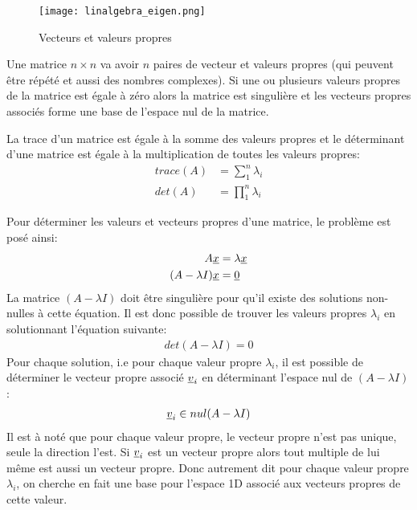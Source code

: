 \begin{figure}[H]
	\centering
		\texttt{[image: linalgebra\_eigen.png]}
	\caption{Vecteurs et valeurs propres}
	\label{fig:eigen}
\end{figure}

Une matrice $n \times n$ va avoir $n$ paires de vecteur et valeurs propres (qui peuvent être répété et aussi des nombres complexes). Si une ou plusieurs valeurs propres de la matrice est égale à zéro alors la matrice est singulière et les vecteurs propres associés forme une base de l'espace nul de la matrice. 

La trace d'un matrice est égale à la somme des valeurs propres et le déterminant d'une matrice est égale à la multiplication de toutes les valeurs propres:
\begin{align}
trace(A) &= \sum_1^n{ \lambda_i } \\
det(A)   &= \prod_1^n{ \lambda_i }
\end{align}

Pour déterminer les valeurs et vecteurs propres d'une matrice, le problème est posé ainsi:
\begin{align}
A \underline{x} &= \lambda  \underline{x} \\
(A - \lambda I) \underline{x} &= \underline{0}
\end{align}
La matrice $(A - \lambda I)$ doit être singulière pour qu'il existe des solutions non-nulles à cette équation. Il est donc possible de trouver les valeurs propres $\lambda_i$ en solutionnant l'équation suivante:
\begin{align}
det(A - \lambda I) = 0
\end{align}
Pour chaque solution, i.e pour chaque valeur propre $\lambda_i$, il est possible de déterminer le vecteur propre associé $\underline{v}_i$ en déterminant l'espace nul de $(A - \lambda I)$:
\begin{align}
\underline{v}_i \in nul(A - \lambda I)
\end{align}
Il est à noté que pour chaque valeur propre, le vecteur propre n'est pas unique, seule la direction l'est. Si $\underline{v}_i$ est un vecteur propre alors tout multiple de lui même est aussi un vecteur propre. Donc autrement dit pour chaque valeur propre $\lambda_i$, on cherche en fait une base pour l'espace 1D associé aux vecteurs propres de cette valeur.



